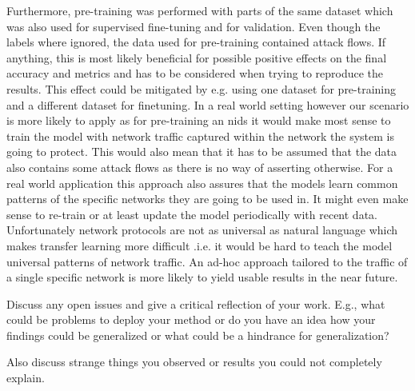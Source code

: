 Furthermore, pre-training was performed with parts of the same dataset which was also used for supervised fine-tuning and for validation. Even though the labels where ignored, the data used for pre-training contained attack flows. If anything, this is most likely beneficial for possible positive effects on the final accuracy and metrics and has to be considered when trying to reproduce the results. This effect could be mitigated by e.g. using one dataset for pre-training and a different dataset for finetuning. In a real world setting however our scenario is more likely to apply as for pre-training an \gls{nids} it would make most sense to train the model with network traffic captured within the network the system is going to protect. This would also mean that it has to be assumed that the data also contains some attack flows as there is no way of asserting otherwise. For a real world application this approach also assures that the models learn common patterns of the specific networks they are going to be used in. It might even make sense to re-train or at least update the model periodically with recent data. Unfortunately network protocols are not as universal as natural language which makes transfer learning more difficult .i.e. it would be hard to teach the model universal patterns of network traffic. An ad-hoc approach tailored to the traffic of a single specific network is more likely to yield usable results in the near future.



Discuss any open issues and give a critical reflection of your work. E.g., what could be problems to deploy your method or do you have an idea how your findings could be generalized or what could be a hindrance for generalization?

Also discuss strange things you observed or results you could not completely explain. 

\newpage